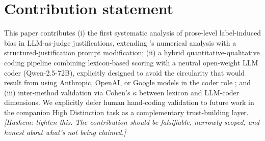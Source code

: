 \documentclass[sigconf,authoryear,nonacm]{acmart}
\begin{document}
\section{Contribution statement}
\label{sec:contribution}


This paper contributes (i) the first systematic analysis of prose-level
label-induced bias in LLM-as-judge justifications, extending
\citet{saraf2025quantifying}'s numerical analysis with a
structured-justification prompt modification; (ii) a hybrid
quantitative-qualitative coding pipeline combining lexicon-based
scoring with a neutral open-weight LLM coder (Qwen-2.5-72B), explicitly
designed to avoid the circularity that would result from using
Anthropic, OpenAI, or Google models in the coder role
\citep{ashwin2025using}; and (iii) inter-method validation via
Cohen's $\kappa$ between lexicon and LLM-coder dimensions. We
explicitly defer human hand-coding validation to future work in the
companion High Distinction task as a complementary trust-building
layer. \emph{[Hashem: tighten this. The contribution should be
falsifiable, narrowly scoped, and honest about what's not being
claimed.]}



\end{document}
